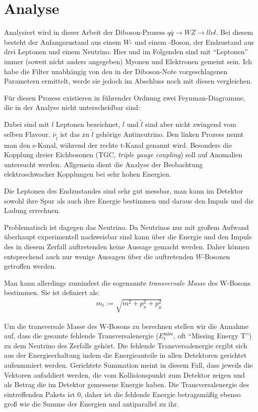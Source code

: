 \section{Analyse}
\label{cha:analyse}
Analysiert wird in dieser Arbeit der Diboson-Prozess $q\bar{q}\to WZ\to ll\nu
l$. Bei diesem besteht der Anfangszustand aus einem $W$- und einem \Z-Boson, der
Endzustand aus drei Leptonen und einem Neutrino.  Hier und im Folgenden sind mit
"`Leptonen"' immer (soweit nicht anders angegeben) Myonen und Elektronen gemeint
sein. Ich habe die Filter unabhängig von den in der Diboson-Note vorgeschlagenen
Parametern\cite{diboson-ana} ermittelt, werde sie jedoch im Abschluss noch mit
diesen vergleichen.

Für diesen Prozess existieren in führender Ordnung zwei Feynman-Diagramme, die
in der Analyse nicht unterscheidbar sind: \\
\begin{center}
   \hspace{2cm}
  
\end{center}

Dabei sind mit $l$ Leptonen bezeichnet, $l$ und $\tilde l$ sind aber nicht
zwingend vom selben Flavour. $\bar \nu_{\tilde l}$ ist das zu $\tilde l$
gehörige Antineutrino. Den linken Prozess nennt man den s-Kanal, während der
rechte t-Kanal genannt wird. Besonders die Kopplung dreier Eichbosonen (TGC,
\emph{triple gauge coupling}) soll auf Anomalien untersucht werden.  Allgemein
dient die Analyse der Beobachtung elektroschwacher Kopplungen bei sehr hohen
Energien.

Die Leptonen des Endzustandes sind sehr gut messbar, man kann im Detektor sowohl
ihre Spur als auch ihre Energie bestimmen und daraus den Impuls und die Ladung
errechnen.

Problematisch ist dagegen das Neutrino. Da Neutrinos nur mit großem Aufwand
überhaupt experimentell nachweisbar sind kann über die Energie und den Impuls
des in diesem Zerfall auftretenden keine Aussage gemacht werden.  Daher können
entsprechend auch nur wenige Aussagen über die auftretenden $W$-Bosonen
getroffen werden.

\label{cha:met}
Man kann allerdings zumindest die sogenannte \emph{transversale Masse} des
W-Bosons bestimmen. Sie ist definiert als:
\begin{align}
  m_t := \sqrt{m^2 + p_x^2 + p_y^2}
  \label{def:trans}
\end{align}

Um die transversale Masse des W-Bosons zu berechnen stellen wir die Annahme auf,
dass die gesamte fehlende Transversalenergie ($E_t^\text{miss}$, oft "`Missing
Energy T"') zu dem Neutrino des Zerfalls gehört. Die fehlende Transversalenergie
ergibt sich aus der Energieerhaltung indem die Energieanteile in allen
Detektoren gerichtet aufsummiert werden. Gerichtete Summation meint in diesem
Fall, dass jeweils die Vektoren aufaddiert werden, die vom Kollisionspunkt zum
Detektor zeigen und als Betrag die im Detektor gemessene Energie haben. Die
Transversalenergie des eintreffenden Pakets ist $0$, daher ist die fehlende
Energie betragsmäßig ebenso groß wie die Summe der Energien und antiparallel zu
ihr.


